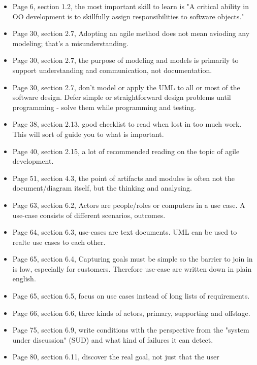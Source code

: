 \begin{itemize}
    \item Page 6, section 1.2, the most important skill to learn is "A critical
        ability in OO development is to skillfully assign responsibilities to
        software objects."
    \item Page 30, section 2.7, Adopting an agile method does not mean avioding
        any modeling; that's a misunderstanding.
    \item Page 30, section 2.7, the purpose of modeling and models is primarily
        to support understanding and communication, not documentation.
    \item Page 30, section 2.7, don't model or apply the UML to all or most of
        the software design. Defer simple or straightforward design problems
        until programming - solve them while programming and testing.
    \item Page 38, section 2.13, good checklist to read when lost in too much
        work. This will sort of guide you to what is important.
    \item Page 40, section 2.15, a lot of recommended reading on the topic of
        agile development.
    \item Page 51, section 4.3, the point of artifacts and modules is often not
        the document/diagram itself, but the thinking and analysing.
    \item Page 63, section 6.2, Actors are people/roles or computers in a use
        case. A use-case consists of different scenarios, outcomes.
    \item Page 64, section 6.3, use-cases are text documents. UML can be used
        to realte use cases to each other.
    \item Page 65, section 6.4, Capturing goals must be simple so the barrier
        to join in is low, especially for customers. Therefore use-case are
        written down in plain english.
    \item Page 65, section 6.5, focus on use cases instead of long lists of
        requirements.
    \item Page 66, section 6.6, three kinds of actors, primary, supporting and
        offstage.
    \item Page 75, section 6.9, write conditions with the perspective from the
        "system under discussion" (SUD) and what kind of failures it can
        detect.
    \item Page 80, section 6.11, discover the real goal, not just that the user

\end{itemize}
